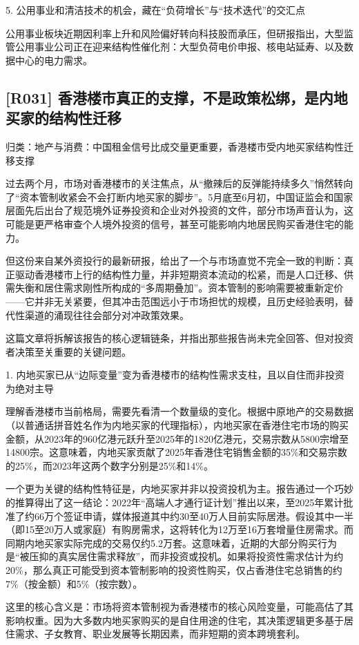 \documentclass[11pt]{ctexart}
\begin{document}
5. 公用事业和清洁技术的机会，藏在“负荷增长”与“技术迭代”的交汇点

公用事业板块近期因利率上升和风险偏好转向科技股而承压，但研报指出，大型监管公用事业公司正在迎来结构性催化剂：大型负荷电价申报、核电站延寿、以及数据中心的电力需求。

\subsection{[R031] 香港楼市真正的支撑，不是政策松绑，是内地买家的结构性迁移}
{\small\color{refgray}归类：地产与消费：中国租金信号比成交量更重要，香港楼市受内地买家结构性迁移支撑}

过去两个月，市场对香港楼市的关注焦点，从“撤辣后的反弹能持续多久”悄然转向了“资本管制收紧会不会打断内地买家的脚步”。5月底至6月初，中国证监会和国家层面先后出台了规范境外证券投资和企业对外投资的文件，部分市场声音认为，这可能是更严格审查个人境外投资的信号，甚至可能影响内地居民购买香港住宅的能力。

但这份来自某外资投行的最新研报，给出了一个与市场直觉不完全一致的判断：真正驱动香港楼市上行的结构性力量，并非短期资本流动的松紧，而是人口迁移、供需失衡和居住需求刚性所构成的“多周期叠加”。资本管制的影响需要被重新定价——它并非无关紧要，但其冲击范围远小于市场担忧的规模，且历史经验表明，替代性渠道的涌现往往会部分对冲政策效果。

这篇文章将拆解该报告的核心逻辑链条，并指出那些报告尚未完全回答、但对投资者决策至关重要的关键问题。

1. 内地买家已从“边际变量”变为香港楼市的结构性需求支柱，且以自住而非投资为绝对主导

理解香港楼市当前格局，需要先看清一个数量级的变化。根据中原地产的交易数据（以普通话拼音姓名作为内地买家的代理指标），内地买家在香港住宅市场的购买金额，从2023年的960亿港元跃升至2025年的1820亿港元，交易宗数从5800宗增至14800宗。这意味着，内地买家贡献了2025年香港住宅销售金额的35\%和交易宗数的25\%，而2023年这两个数字分别是25\%和14\%。

一个更为关键的结构性特征是，内地买家并非以投资投机为主。报告通过一个巧妙的推算得出了这一结论：2022年“高端人才通行证计划”推出以来，至2025年累计批准了约66万个签证申请，媒体报道其中约30至40万人目前实际居港。假设其中一半（即15至20万人或家庭）有购房需求，这将转化为12万至16万套增量住房需求。而同期内地买家实际完成的交易仅约5.2万套。这意味着，近期的大部分购买行为是“被压抑的真实居住需求释放”，而非投资或投机。如果将投资性需求估计为约20\%，那么真正可能受到资本管制影响的投资性购买，仅占香港住宅总销售的约7\%（按金额）和5\%（按宗数）。

这里的核心含义是：市场将资本管制视为香港楼市的核心风险变量，可能高估了其影响权重。因为大多数内地买家购买的是自住用途的住宅，其决策逻辑更多基于居住需求、子女教育、职业发展等长期因素，而非短期的资本跨境套利。
\end{document}
